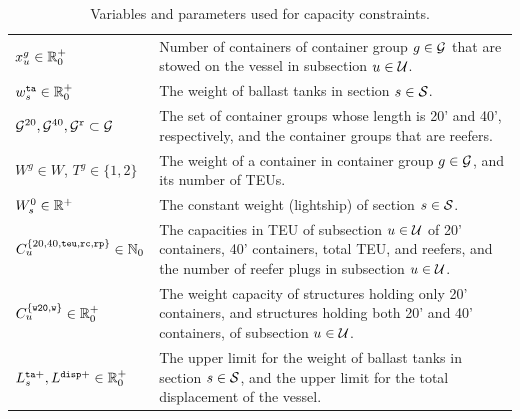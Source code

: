 \begin{table}[htbp]
\begin{tabular}{lp{10cm}}
$x^g_u\in\mathbb{R}^+_0$						& Number of containers of container group $g\in \mathcal{G}$ that are stowed on the vessel in subsection $u\in \mathcal{U}$.\\
$w^{\texttt{ta}}_s\in\mathbb{R}^+_0$		& The weight of ballast tanks in section $s\in\mathcal{S}$.\\
\hline
$\mathcal{G}^{20}, \mathcal{G}^{40}, \mathcal{G}^\texttt{r}\subset \mathcal{G}$ 
																& The set of container groups whose length is 20' and 40', respectively, and the container groups that are reefers.\\
$W^g\in {W}$, $T^g\in\{1,2\}$		& The weight of a container in container group $g\in \mathcal{G}$, and its number of TEUs.\\
$W^0_{s}\in\mathbb{R}^+$						& The constant weight (lightship) of section $s\in\mathcal{S}$.\\
$C^{\{{20},{40},\texttt{teu}, \texttt{rc}, \texttt{rp}\}}_u\in \mathbb{N}_0$  											
																& The capacities in TEU of subsection $u\in\mathcal{U}$ of 20' containers, 40' containers, total TEU, and reefers, and the number of reefer plugs in subsection $u\in \mathcal{U}$.\\
$C^{\{\texttt{w20}, \texttt{w}\}}_u\in\mathbb{R}^+_0$
																& The weight capacity of structures holding only 20' containers, and structures holding both 20' and 40' containers, of subsection $u\in\mathcal{U}$.\\
$L^{\texttt{ta}+}_s, L^{\texttt{disp}+}\in\mathbb{R}^+_0$
																& The upper limit for the weight of ballast tanks in section $s\in\mathcal{S}$, and the upper limit for the total displacement of the vessel.\\
\end{tabular}
\caption{Variables and parameters used for capacity constraints.}\label{tab:capParams}
\end{table}


